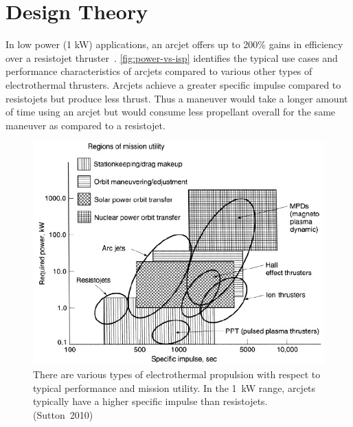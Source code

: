 \documentclass[journal]{IEEEtran}
\begin{document}
\section{Design Theory}
\label{sec:method}
In low power (1 kW) applications, an arcjet offers up to 200\% gains in efficiency over a resistojet thruster~\cite{sutton2010rocket}.
\autoref{fig:power-vs-isp} identifies the typical use cases and performance characteristics of arcjets compared to various other types of electrothermal thrusters.
Arcjets achieve a greater specific impulse compared to resistojets but produce less thrust.
Thus a maneuver would take a longer amount of time using an arcjet but would consume less propellant overall for the same maneuver as compared to a resistojet.
\begin{figure}[htp]
  \centering
  \includegraphics[width=\linewidth]{figs/power-vs-isp_sutton}
  \caption[Types of electrothermal propulsion]{There are various types of electrothermal propulsion with respect to typical performance and mission utility.
  In the \SI{1}{\kilo\watt} range, arcjets typically have a higher specific impulse than resistojets. (Sutton~2010)
\label{fig:power-vs-isp}}
\end{figure}
\end{document}
